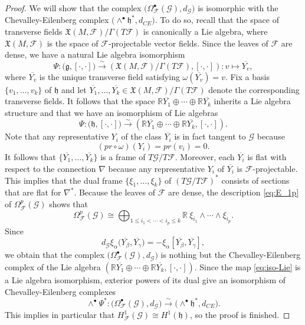 \documentclass[11pt, letterpaper, oneside,reqno]{amsart}
\theoremstyle{plain}
\theoremstyle{underline}
\theoremstyle{definition}
\theoremstyle{remark}
\begin{document}
\begin{proof}
		We will show that the complex  $\big(\Omega^{\bullet}_{\mathcal{F}}(\mathcal{G}),d_{\mathcal{G}}\big)$ is isomorphic with the Chevalley-Eilenberg complex $\big(\wedge^{\bullet}\mathfrak{h}^{*},d_{CE}\big)$.
		To do so, recall that the space of transverse fields $\mathfrak{X}(M,\mathcal{F})/\Gamma(T\mathcal{F})$ is canonically a Lie algebra, where $\mathfrak{X}(M,\mathcal{F})$ is the space of $\mathcal{F}$-projectable vector fields. Since the leaves of $\mathcal{F}$ are dense, we have a natural Lie algebra isomorphism
		\[
		\Psi:\big(\mathfrak{g},[\cdot,\cdot]\big)\overset{\sim}{\longrightarrow}\left(\mathfrak{X}(M,\mathcal{F})/\Gamma(T\mathcal{F}),[\cdot,\cdot]\right):v\mapsto \overline{Y_v},
		\]
		where $\overline{Y_v}$ is the unique transverse field satisfying $\omega(\overline{Y_v})=v$.
		Fix a basis $\{v_1,\ldots,v_k\}$ of $\mathfrak{h}$ and let $\overline{Y_1},\ldots,\overline{Y_k}\in\mathfrak{X}(M,\mathcal{F})/\Gamma(T\mathcal{F})$ denote the corresponding transverse fields.
		It follows that the space $\mathbb{R}\overline{Y_1}\oplus\cdots\oplus\mathbb{R}\overline{Y_k}$ inherits a Lie algebra structure and that we have an isomorphism of Lie algebras
		\begin{equation}\label{eq:iso-Lie}
			\Psi:\big(\mathfrak{h},[\cdot,\cdot]\big)\overset{\sim}{\longrightarrow}\left(\mathbb{R}\overline{Y_1}\oplus\cdots\oplus\mathbb{R}\overline{Y_k},[\cdot,\cdot]\right).
		\end{equation}
		Note that any representative $Y_i$ of the class $\overline{Y_i}$ is in fact tangent to $\mathcal{G}$ because
		\[
		(pr\circ\omega)(Y_i)=pr(v_i)=0.
		\]
		It follows that $\{\overline{Y_1},\ldots,\overline{Y_k}\}$ is a frame of $T\mathcal{G}/T\mathcal{F}$. Moreover, each  $\overline{Y_i}$ is flat with respect to the connection $\nabla$ because any representative $Y_i$ of $\overline{Y_i}$ is $\mathcal{F}$-projectable. This implies that the dual frame $\{\xi_1,\ldots,\xi_k\}$ of $(T\mathcal{G}/T\mathcal{F})^{*}$ consists of sections that are flat for $\nabla^{*}$. Because the leaves of $\mathcal{F}$ are dense, the description \eqref{eq:E_1p} of $\Omega^{p}_{\mathcal{F}}(\mathcal{G})$ shows that
		\[
		\Omega^{p}_{\mathcal{F}}(\mathcal{G})\cong\bigoplus_{1\leq i_1<\cdots<i_p\leq k}\mathbb{R}~\xi_{i_1}\wedge\cdots\wedge\xi_{i_p}.
		\]
		Since 
		\[
		d_{\mathcal{G}}\xi_\alpha\big(\overline{Y_\beta},\overline{Y_\gamma}\big)=-\xi_{\alpha}[\overline{Y_\beta},\overline{Y_\gamma}],
		\]
		we obtain that the complex $\big(\Omega^{\bullet}_{\mathcal{F}}(\mathcal{G}),d_{\mathcal{G}}\big)$ is nothing but the Chevalley-Eilenberg complex of the Lie algebra $\left(\mathbb{R}\overline{Y_1}\oplus\cdots\oplus\mathbb{R}\overline{Y_k},[\cdot,\cdot]\right)$. Since the map \eqref{eq:iso-Lie} is a Lie algebra isomorphism, exterior powers of its dual give an isomorphism of Chevalley-Eilenberg complexes
		\[
		\wedge^{\bullet}\Psi^{*}:\big(\Omega^{\bullet}_{\mathcal{F}}(\mathcal{G}),d_{\mathcal{G}}\big)\overset{\sim}{\longrightarrow}\big(\wedge^{\bullet}\mathfrak{h}^{*},d_{CE}\big).
		\]
		This implies in particular that $H^{1}_{\mathcal{F}}(\mathcal{G})\cong H^{1}(\mathfrak{h})$, so the proof is finished.
	\end{proof}
	
\end{document}
